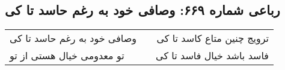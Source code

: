 \begin{center}
\section*{رباعی شماره ۶۶۹: وصافی خود به رغم حاسد تا کی}
\label{sec:sh669}
\begin{longtable}{l p{0.5cm} r}
وصافی خود به رغم حاسد تا کی
&&
ترویج چنین متاع کاسد تا کی
\\
تو معدومی خیال هستی از تو
&&
فاسد باشد خیال فاسد تا کی
\\
\end{longtable}
\end{center}
